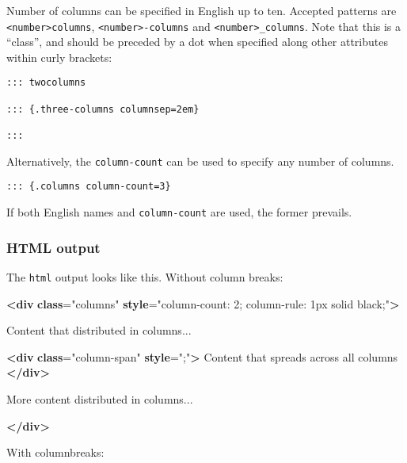 \documentclass[
]{article}
\newenvironment{Shaded}{}{}
\newcommand{\ErrorTok}[1]{\textcolor[rgb]{1.00,0.00,0.00}{\textbf{#1}}}
\newcommand{\KeywordTok}[1]{\textcolor[rgb]{0.00,0.44,0.13}{\textbf{#1}}}
\newcommand{\NormalTok}[1]{#1}
\newcommand{\OtherTok}[1]{\textcolor[rgb]{0.00,0.44,0.13}{#1}}
\newcommand{\StringTok}[1]{\textcolor[rgb]{0.25,0.44,0.63}{#1}}
\begin{document}
Number of columns can be specified in English up to ten. Accepted
patterns are \texttt{\textless{}number\textgreater{}columns},
\texttt{\textless{}number\textgreater{}-columns} and
\texttt{\textless{}number\textgreater{}\_columns}. Note that this is a
``class'', and should be preceded by a dot when specified along other
attributes within curly brackets:

\begin{verbatim}
::: twocolumns

::: {.three-columns columnsep=2em}

:::
\end{verbatim}

Alternatively, the \texttt{column-count} can be used to specify any
number of columns.

\begin{verbatim}
::: {.columns column-count=3}
\end{verbatim}

If both English names and \texttt{column-count} are used, the former
prevails.

\hypertarget{html-output}{%
\subsubsection{HTML output}\label{html-output}}

The \texttt{html} output looks like this. Without column breaks:

\begin{Shaded}
\begin{Highlighting}[]
\KeywordTok{\textless{}div} \ErrorTok{class}\OtherTok{=}\StringTok{"columns"} \ErrorTok{style}\OtherTok{=}\StringTok{"column{-}count: 2; column{-}rule: 1px solid black;"}\KeywordTok{\textgreater{}}

\NormalTok{Content that distributed in columns...}

\KeywordTok{\textless{}div} \ErrorTok{class}\OtherTok{=}\StringTok{"column{-}span"} \ErrorTok{style}\OtherTok{=}\StringTok{";"}\KeywordTok{\textgreater{}}
\NormalTok{Content that spreads across all columns}
\KeywordTok{\textless{}/div\textgreater{}}

\NormalTok{More content distributed in columns...}

\KeywordTok{\textless{}/div\textgreater{}}
\end{Highlighting}
\end{Shaded}

With columnbreaks:
\end{document}
